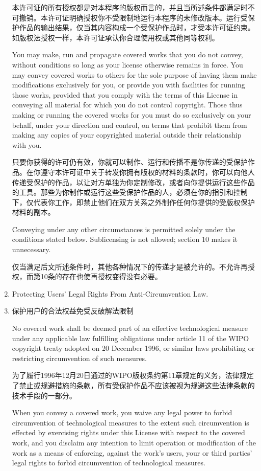 \documentclass[11pt]{article}
\begin{document}
\begin{enumerate}
本许可证的所有授权都是对本程序的版权而言的，并且当所述条件都满足时不可撤销。本许可证明确授权你不受限制地运行本程序的未修改版本。运行受保护作品的输出结果，仅当其内容构成一个受保护作品时，才受本许可证约束。如版权法授权一样，本许可证承认你合理使用权或其他同等权利。

You may make, run and propagate covered works that you do not
convey, without conditions so long as your license otherwise remains
in force.  You may convey covered works to others for the sole purpose
of having them make modifications exclusively for you, or provide you
with facilities for running those works, provided that you comply with
the terms of this License in conveying all material for which you do
not control copyright.  Those thus making or running the covered works
for you must do so exclusively on your behalf, under your direction
and control, on terms that prohibit them from making any copies of
your copyrighted material outside their relationship with you.

只要你获得的许可仍有效，你就可以制作、运行和传播不是你传递的受保护作品。在你遵守本许可证中关于转发你拥有版权的材料的条款时，你可以向他人传递受保护的作品，以让对方单独为你定制修改，或者向你提供运行这些作品的工具。那些为你制作或运行这些受保护作品的人，必须在你的指引和控制下，仅代表你工作，即禁止他们在双方关系之外制作任何你提供的受版权保护材料的副本。

Conveying under any other circumstances is permitted solely under
the conditions stated below.  Sublicensing is not allowed; section 10
makes it unnecessary.

仅当满足后文所述条件时，其他各种情况下的传递才是被允许的。不允许再授权，而第10条的存在也使再授权变得没有必要。

\item Protecting Users' Legal Rights From Anti-Circumvention Law.
\item 保护用户的合法权益免受反破解法限制

No covered work shall be deemed part of an effective technological
measure under any applicable law fulfilling obligations under article
11 of the WIPO copyright treaty adopted on 20 December 1996, or
similar laws prohibiting or restricting circumvention of such
measures.

为了履行1996年12月20日通过的WIPO版权条约第11章规定的义务，法律规定了禁止或规避措施的条款，所有受保护作品不应该被视为规避这些法律条款的技术手段的一部分。

When you convey a covered work, you waive any legal power to forbid
circumvention of technological measures to the extent such circumvention
is effected by exercising rights under this License with respect to
the covered work, and you disclaim any intention to limit operation or
modification of the work as a means of enforcing, against the work's
users, your or third parties' legal rights to forbid circumvention of
technological measures.


\end{enumerate}
\end{document}
